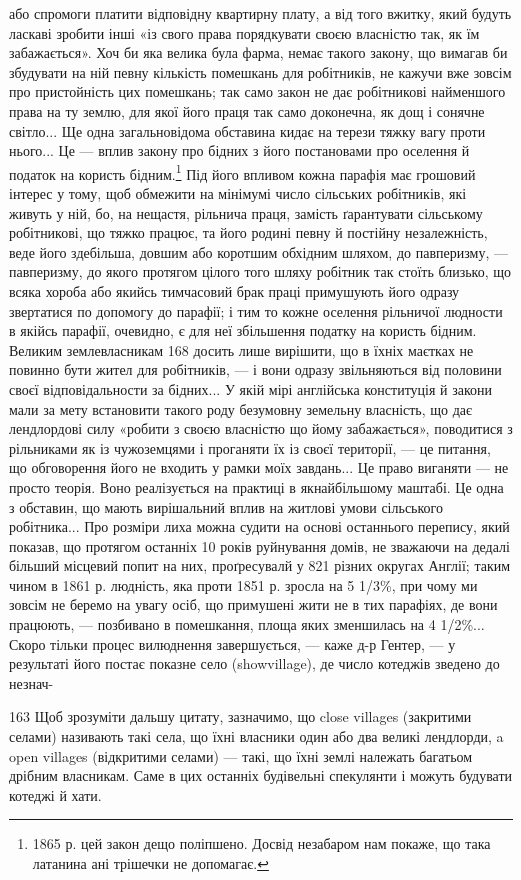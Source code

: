або спромоги платити відповідну квартирну плату, а від того
вжитку, який будуть ласкаві зробити інші «із свого права порядкувати
своєю власністю так, як їм забажається». Хоч би яка
велика була фарма, немає такого закону, що вимагав би збудувати
на ній певну кількість помешкань для робітників, не кажучи
вже зовсім про пристойність цих помешкань; так само
закон не дає робітникові найменшого права на ту землю, для якої
його праця так само доконечна, як дощ і сонячне світло... Ще
одна загальновідома обставина кидає на терези тяжку вагу проти
нього... Це — вплив закону про бідних з його постановами про
оселення й податок на користь бідним.\footnote{
1865 р. цей закон дещо поліпшено. Досвід незабаром нам покаже,
що така латанина ані трішечки не допомагає.
} Під його впливом кожна
парафія має грошовий інтерес у тому, щоб обмежити на мінімумі
число сільських робітників, які живуть у ній, бо, на нещастя,
рільнича праця, замість ґарантувати сільському робітникові,
що тяжко працює, та його родині певну й постійну незалежність,
веде його здебільша, довшим або коротшим обхідним
шляхом, до павперизму, — павперизму, до якого протягом цілого
того шляху робітник так стоїть близько, що всяка хороба
або якийсь тимчасовий брак праці примушують його одразу звертатися
по допомогу до парафії; і тим то кожне оселення рільничої
людности в якійсь парафії, очевидно, є для неї збільшення
податку на користь бідним. Великим землевласникам 168 досить
лише вирішити, що в їхніх маєтках не повинно бути жител для
робітників, — і вони одразу звільняються від половини своєї
відповідальности за бідних... У якій мірі англійська конституція
й закони мали за мету встановити такого роду безумовну
земельну власність, що дає лендлордові силу «робити з своєю
власністю що йому забажається», поводитися з рільниками
як із чужоземцями і проганяти їх із своєї території, — це питання,
що обговорення його не входить у рамки моїх завдань...
Це право виганяти — не просто теорія. Воно реалізується
на практиці в якнайбільшому маштабі. Це одна з обставин, що
мають вирішальний вплив на житлові умови сільського робітника...
Про розміри лиха можна судити на основі останнього
перепису, який показав, що протягом останніх 10 років руйнування
домів, не зважаючи на дедалі більший місцевий попит на
них, проґресувалй у 821 різних округах Англії; таким чином в
1861 р. людність, яка проти 1851 р. зросла на 5 1/3\%, при чому
ми зовсім не беремо на увагу осіб, що примушені жити не в тих
парафіях, де вони працюють, — позбивано в помешкання, площа
яких зменшилась на 4 1/2\%... Скоро тільки процес вилюднення
завершується, — каже д-р Гентер, — у результаті його постає
показне село (showvillage), де число котеджів зведено до незнач-

163 Щоб зрозуміти дальшу цитату, зазначимо, що close villages (закритими
селами) називають такі села, що їхні власники один
або два великі лендлорди, a open villages (відкритими селами) — такі,
що їхні землі належать багатьом дрібним власникам. Саме в цих останніх
будівельні спекулянти і можуть будувати котеджі й хати.
